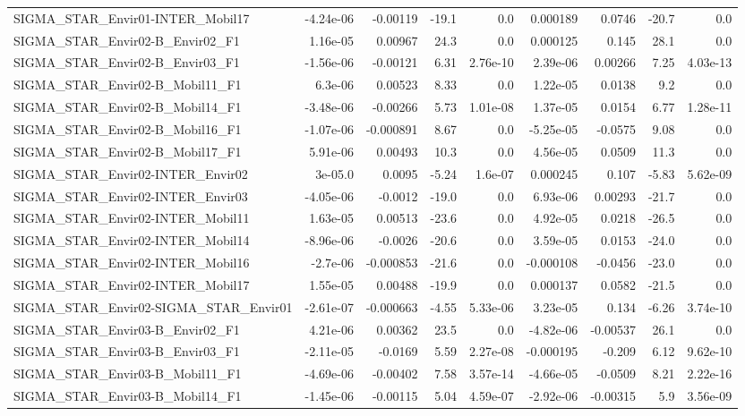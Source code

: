 \begin{tabular}{lrrrrrrrr}
SIGMA_STAR_Envir01-INTER_Mobil17 & -4.24e-06 & -0.00119 & -19.1 & 0.0 & 0.000189 & 0.0746 & -20.7 & 0.0 \\
SIGMA_STAR_Envir02-B_Envir02_F1 & 1.16e-05 & 0.00967 & 24.3 & 0.0 & 0.000125 & 0.145 & 28.1 & 0.0 \\
SIGMA_STAR_Envir02-B_Envir03_F1 & -1.56e-06 & -0.00121 & 6.31 & 2.76e-10 & 2.39e-06 & 0.00266 & 7.25 & 4.03e-13 \\
SIGMA_STAR_Envir02-B_Mobil11_F1 & 6.3e-06 & 0.00523 & 8.33 & 0.0 & 1.22e-05 & 0.0138 & 9.2 & 0.0 \\
SIGMA_STAR_Envir02-B_Mobil14_F1 & -3.48e-06 & -0.00266 & 5.73 & 1.01e-08 & 1.37e-05 & 0.0154 & 6.77 & 1.28e-11 \\
SIGMA_STAR_Envir02-B_Mobil16_F1 & -1.07e-06 & -0.000891 & 8.67 & 0.0 & -5.25e-05 & -0.0575 & 9.08 & 0.0 \\
SIGMA_STAR_Envir02-B_Mobil17_F1 & 5.91e-06 & 0.00493 & 10.3 & 0.0 & 4.56e-05 & 0.0509 & 11.3 & 0.0 \\
SIGMA_STAR_Envir02-INTER_Envir02 & 3e-05.0 & 0.0095 & -5.24 & 1.6e-07 & 0.000245 & 0.107 & -5.83 & 5.62e-09 \\
SIGMA_STAR_Envir02-INTER_Envir03 & -4.05e-06 & -0.0012 & -19.0 & 0.0 & 6.93e-06 & 0.00293 & -21.7 & 0.0 \\
SIGMA_STAR_Envir02-INTER_Mobil11 & 1.63e-05 & 0.00513 & -23.6 & 0.0 & 4.92e-05 & 0.0218 & -26.5 & 0.0 \\
SIGMA_STAR_Envir02-INTER_Mobil14 & -8.96e-06 & -0.0026 & -20.6 & 0.0 & 3.59e-05 & 0.0153 & -24.0 & 0.0 \\
SIGMA_STAR_Envir02-INTER_Mobil16 & -2.7e-06 & -0.000853 & -21.6 & 0.0 & -0.000108 & -0.0456 & -23.0 & 0.0 \\
SIGMA_STAR_Envir02-INTER_Mobil17 & 1.55e-05 & 0.00488 & -19.9 & 0.0 & 0.000137 & 0.0582 & -21.5 & 0.0 \\
SIGMA_STAR_Envir02-SIGMA_STAR_Envir01 & -2.61e-07 & -0.000663 & -4.55 & 5.33e-06 & 3.23e-05 & 0.134 & -6.26 & 3.74e-10 \\
SIGMA_STAR_Envir03-B_Envir02_F1 & 4.21e-06 & 0.00362 & 23.5 & 0.0 & -4.82e-06 & -0.00537 & 26.1 & 0.0 \\
SIGMA_STAR_Envir03-B_Envir03_F1 & -2.11e-05 & -0.0169 & 5.59 & 2.27e-08 & -0.000195 & -0.209 & 6.12 & 9.62e-10 \\
SIGMA_STAR_Envir03-B_Mobil11_F1 & -4.69e-06 & -0.00402 & 7.58 & 3.57e-14 & -4.66e-05 & -0.0509 & 8.21 & 2.22e-16 \\
SIGMA_STAR_Envir03-B_Mobil14_F1 & -1.45e-06 & -0.00115 & 5.04 & 4.59e-07 & -2.92e-06 & -0.00315 & 5.9 & 3.56e-09 \\

\end{tabular}
